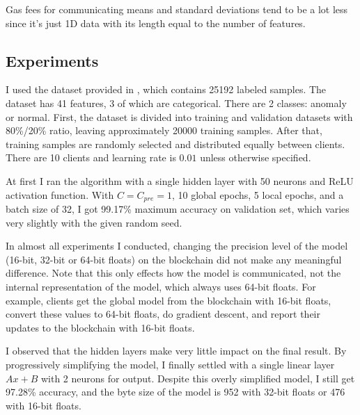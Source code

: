 Gas fees for communicating means and standard deviations tend to be a lot less since it's just 1D data with its length equal to the number of features.


\subsection{Experiments}

I used the dataset provided in \cite{favoriteDataset}, which contains 25192 labeled samples.
The dataset has 41 features, 3 of which are categorical.
There are 2 classes: anomaly or normal.
First, the dataset is divided into training and validation datasets with 80\%/20\% ratio, leaving approximately 20000 training samples.
After that, training samples are randomly selected and distributed equally between clients.
There are 10 clients and learning rate is $0.01$ unless otherwise specified.

At first I ran the algorithm with a single hidden layer with 50 neurons and ReLU activation function.
With $C = C_{pre} = 1$, 10 global epochs, 5 local epochs, and a batch size of 32, I got 99.17\% maximum accuracy on validation set, which varies very slightly with the given random seed.

In almost all experiments I conducted, changing the precision level of the model (16-bit, 32-bit or 64-bit floats) on the blockchain did not make any meaningful difference.
Note that this only effects how the model is communicated, not the internal representation of the model, which always uses 64-bit floats.
For example, clients get the global model from the blockchain with 16-bit floats, convert these values to 64-bit floats, do gradient descent, and report their updates to the blockchain with 16-bit floats.

I observed that the hidden layers make very little impact on the final result.
By progressively simplifying the model, I finally settled with a single linear layer $Ax + B$ with 2 neurons for output.
Despite this overly simplified model, I still get 97.28\% accuracy, and the byte size of the model is 952 with 32-bit floats or 476 with 16-bit floats.

